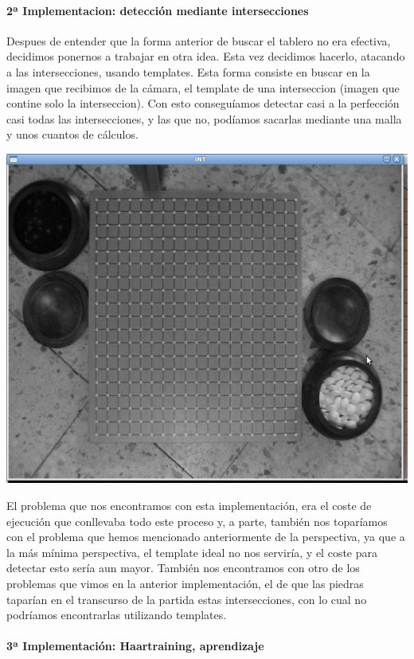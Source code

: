 \documentclass[12pt,a4paper]{report}
\begin{document}
\paragraph{2ª Implementacion: detección mediante intersecciones}

Despues de entender que la forma anterior de buscar el tablero no era efectiva,
decidimos ponernos a trabajar en otra idea. Esta vez decidimos hacerlo, atacando
a las intersecciones, usando templates. Esta forma consiste en buscar en la
imagen que recibimos de la cámara, el template de una interseccion (imagen
que contine solo la interseccion). Con esto conseguíamos detectar casi a la
perfección casi todas las intersecciones, y las que no, podíamos sacarlas
mediante una malla y unos cuantos de cálculos.

\includegraphics[scale=0.6]{detec-intersecciones.png}

El problema que nos encontramos con esta implementación, era el coste de
ejecución que conllevaba todo este proceso y, a parte, también nos toparíamos
con el problema que hemos mencionado anteriormente de la perspectiva, ya que a
la más mínima perspectiva, el template ideal no nos serviría, y el coste para
detectar esto sería aun mayor. 
También nos encontramos con otro de los problemas que vimos en la anterior
implementación, el de que las piedras taparían en el transcurso de la partida
estas intersecciones, con lo cual no podríamos encontrarlas utilizando
templates.

\paragraph{3ª Implementación: Haartraining, aprendizaje}
\end{document}
